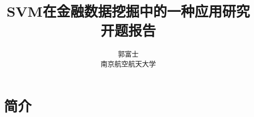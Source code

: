 \documentclass[lang=cn,11pt,a4paper]{elegantpaper}
\title{SVM在金融数据挖掘中的一种应用研究 \\ 开题报告}
\author{郭富士 \\ 南京航空航天大学}
\institute{}
\date{\zhtoday}
\begin{document}
	\maketitle

	\begin{abstract}

	\keywords{}
	\end{abstract}

	\section{简介}
	
\end{document}
